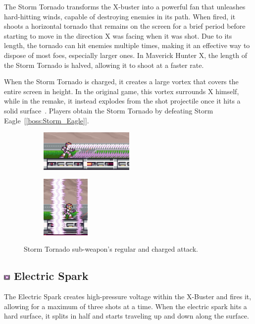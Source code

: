 The Storm Tornado transforms the X-buster into a powerful fan that unleashes hard-hitting winds, capable of destroying enemies in its path. When fired, it shoots a horizontal tornado that remains on the screen for a brief period before starting to move in the direction X was facing when it was shot. Due to its length, the tornado can hit enemies multiple times, making it an effective way to dispose of most foes, especially larger ones. In Maverick Hunter X, the length of the Storm Tornado is halved, allowing it to shoot at a faster rate.

When the Storm Tornado is charged, it creates a large vortex that covers the entire screen in height. In the original game, this vortex surrounds X himself, while in the remake, it instead explodes from the shot projectile once it hits a solid surface~\cite{wiki:Storm_tornado}. Players obtain the Storm Tornado by defeating Storm Eagle~[\ref{boss:Storm_Eagle}]. 
\begin{figure}[htp]
	\centering
	\begin{subfigure}{0.36\linewidth}
		\centering
		\includegraphics[height=2cm]{figures/X1/weapons/Storm_tornado_1.jpg}
	\end{subfigure}
	\begin{subfigure}{0.36\linewidth}
		\centering
		\includegraphics[height=3cm]{figures/X1/weapons/Storm_tornado_2.jpg}
	\end{subfigure}
	\caption{Storm Tornado sub-weapon's regular and charged attack.}
\end{figure}

\subsection{\includegraphics[width=12px, height=10px]{figures/X1/weapons/E_Spark.jpg} Electric Spark}\label{Electric_spark}
The Electric Spark creates high-pressure voltage within the X-Buster and fires it, allowing for a maximum of three shots at a time. When the electric spark hits a hard surface, it splits in half and starts traveling up and down along the surface.

